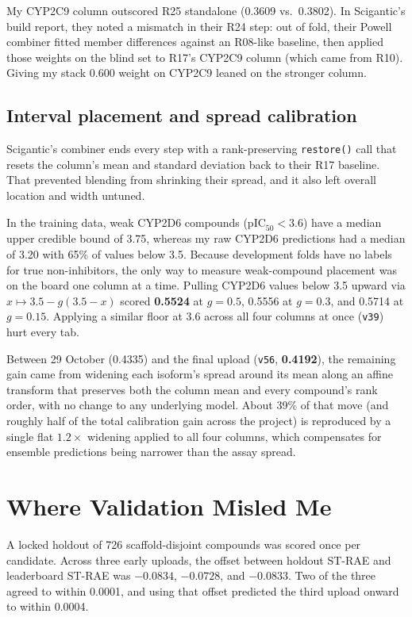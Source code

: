 \documentclass[11pt]{article}
\begin{document}
My CYP2C9 column outscored R25 standalone (0.3609 vs.\ 0.3802). In Scigantic's build report, they noted a mismatch in their R24 step: out of fold, their Powell combiner fitted member differences against an R08-like baseline, then applied those weights on the blind set to R17's CYP2C9 column (which came from R10). Giving my stack 0.600 weight on CYP2C9 leaned on the stronger column.

\subsection{Interval placement and spread calibration}
Scigantic's combiner ends every step with a rank-preserving \texttt{restore()} call that resets the column's mean and standard deviation back to their R17 baseline. That prevented blending from shrinking their spread, and it also left overall location and width untuned.

In the training data, weak CYP2D6 compounds ($\text{pIC}_{50} < 3.6$) have a median upper credible bound of 3.75, whereas my raw CYP2D6 predictions had a median of 3.20 with 65\% of values below 3.5. Because development folds have no labels for true non-inhibitors, the only way to measure weak-compound placement was on the board one column at a time. Pulling CYP2D6 values below 3.5 upward via $x \mapsto 3.5 - g(3.5 - x)$ scored \textbf{0.5524} at $g = 0.5$, 0.5556 at $g = 0.3$, and 0.5714 at $g = 0.15$. Applying a similar floor at 3.6 across all four columns at once (\texttt{v39}) hurt every tab.

Between 29 October (0.4335) and the final upload (\texttt{v56}, \textbf{0.4192}), the remaining gain came from widening each isoform's spread around its mean along an affine transform that preserves both the column mean and every compound's rank order, with no change to any underlying model. About 39\% of that move (and roughly half of the total calibration gain across the project) is reproduced by a single flat $1.2\times$ widening applied to all four columns, which compensates for ensemble predictions being narrower than the assay spread.

\section{Where Validation Misled Me}

A locked holdout of 726 scaffold-disjoint compounds was scored once per candidate. Across three early uploads, the offset between holdout ST-RAE and leaderboard ST-RAE was $-0.0834$, $-0.0728$, and $-0.0833$. Two of the three agreed to within 0.0001, and using that offset predicted the third upload onward to within 0.0004.
\end{document}
